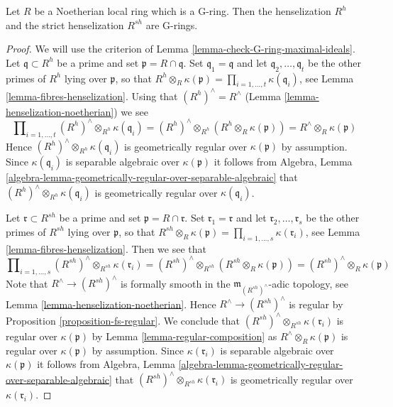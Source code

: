 \begin{lemma}
\label{lemma-henselization-G-ring}
Let $R$ be a Noetherian local ring which is a G-ring.
Then the henselization $R^h$ and the strict henselization $R^{sh}$
are G-rings.
\end{lemma}

\begin{proof}
We will use the criterion of Lemma \ref{lemma-check-G-ring-maximal-ideals}.
Let $\mathfrak q \subset R^h$ be a prime and set
$\mathfrak p = R \cap \mathfrak q$. Set $\mathfrak q_1 = \mathfrak q$
and let $\mathfrak q_2, \ldots, \mathfrak q_t$
be the other primes of $R^h$ lying over $\mathfrak p$, so that
$R^h \otimes_R \kappa(\mathfrak p) =
\prod\nolimits_{i = 1, \ldots, t} \kappa(\mathfrak q_i)$, see
Lemma \ref{lemma-fibres-henselization}.
Using that $(R^h)^\wedge = R^\wedge$
(Lemma \ref{lemma-henselization-noetherian}) we see
$$
\prod\nolimits_{i = 1, \ldots, t}
(R^h)^\wedge \otimes_{R^h} \kappa(\mathfrak q_i) =
(R^h)^\wedge \otimes_{R^h} (R^h \otimes_R \kappa(\mathfrak p)) =
R^\wedge \otimes_R \kappa(\mathfrak p)
$$
Hence $(R^h)^\wedge \otimes_{R^h} \kappa(\mathfrak q_i)$
is geometrically regular over $\kappa(\mathfrak p)$ by assumption.
Since $\kappa(\mathfrak q_i)$ is separable algebraic over $\kappa(\mathfrak p)$
it follows from Algebra, Lemma
\ref{algebra-lemma-geometrically-regular-over-separable-algebraic} that
$(R^h)^\wedge \otimes_{R^h} \kappa(\mathfrak q_i)$ is
geometrically regular over $\kappa(\mathfrak q_i)$.

\medskip\noindent
Let $\mathfrak r \subset R^{sh}$ be a prime and set
$\mathfrak p = R \cap \mathfrak r$. Set $\mathfrak r_1 = \mathfrak r$
and let $\mathfrak r_2, \ldots, \mathfrak r_s$
be the other primes of $R^{sh}$ lying over $\mathfrak p$, so that
$R^{sh} \otimes_R \kappa(\mathfrak p) =
\prod\nolimits_{i = 1, \ldots, s} \kappa(\mathfrak r_i)$, see
Lemma \ref{lemma-fibres-henselization}.
Then we see that
$$
\prod\nolimits_{i = 1, \ldots, s}
(R^{sh})^\wedge \otimes_{R^{sh}} \kappa(\mathfrak r_i) =
(R^{sh})^\wedge \otimes_{R^{sh}} (R^{sh} \otimes_R \kappa(\mathfrak p)) =
(R^{sh})^\wedge \otimes_R \kappa(\mathfrak p)
$$
Note that $R^\wedge \to (R^{sh})^\wedge$ is formally smooth
in the $\mathfrak m_{(R^{sh})^\wedge}$-adic topology, see
Lemma \ref{lemma-henselization-noetherian}.
Hence $R^\wedge \to (R^{sh})^\wedge$ is regular by
Proposition \ref{proposition-fs-regular}.
We conclude that $(R^{sh})^\wedge \otimes_{R^{sh}} \kappa(\mathfrak r_i)$
is regular over $\kappa(\mathfrak p)$ by
Lemma \ref{lemma-regular-composition} as
$R^\wedge \otimes_R \kappa(\mathfrak p)$ is regular over $\kappa(\mathfrak p)$
by assumption. Since $\kappa(\mathfrak r_i)$ is separable algebraic over
$\kappa(\mathfrak p)$
it follows from Algebra, Lemma
\ref{algebra-lemma-geometrically-regular-over-separable-algebraic} that
$(R^{sh})^\wedge \otimes_{R^{sh}} \kappa(\mathfrak r_i)$ is
geometrically regular over $\kappa(\mathfrak r_i)$.
\end{proof}